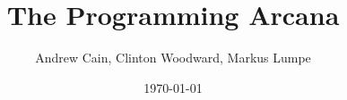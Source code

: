\newcommand{\mccode}[4]
{
  \lstset{language=C}
  
}


\newcommand{\csnipet}[1]
{
  \lstset{language=C}
  \lstinline^#1^
}

\newcommand{\bashcode}[3]
{
  \lstset{language=bash}
  
}

\newcommand{\bashsnipet}[1]
{
  \lstset{language=bash}
  \lstinline^#1^
}


\captionsetup[lstlisting]{labelfont=bf} 

\addtolength{\evensidemargin}{-0.50in}
\addtolength{\textwidth}{0.50in}

\addtolength{\topmargin}{-0.25in}
\addtolength{\textheight}{1.25in}

\usepackage{phdthesis}


\usepackage{lipsum,framed,color}

\newlength{\boxwidth}
\newsavebox{\boxcontainer}

\newcommand\mybox[1]{%
  \begin{center}%
    \fcolorbox{black}{shadecolor}{%
      \begin{minipage}[t]{\dimexpr\textwidth-2\fboxsep-2\fboxrule}%
        #1%
      \end{minipage}}%
  \end{center}}

\newenvironment{Mybox}%
  {\begin{lrbox}{\boxcontainer}%
     \begin{minipage}{\dimexpr\textwidth-2\fboxsep-2\fboxrule}}%
  {\end{minipage}\end{lrbox}%
   \begin{center}%
     \fcolorbox{black}{shadecolor}{\usebox{\boxcontainer}}
   \end{center}}

\newenvironment{MyBox}{%
  \def\FrameCommand{\fcolorbox{black}{shadecolor}}%
  \MakeFramed{\setlength{\hsize}{\dimexpr\textwidth-2\fboxsep-2\fboxrule} \FrameRestore}}%
{\endMakeFramed}

\setlength{\fboxrule}{0pt}
\setlength{\fboxsep}{9pt}

\setlength{\FrameRule}{\fboxrule}
\setlength{\FrameSep}{\fboxsep}

\usepackage[bookmarks=true,colorlinks=true,linkcolor=blue,plainpages=false,pdfpagelabels]{hyperref}




\title{The Programming Arcana}
\author{Andrew Cain, Clinton Woodward, Markus Lumpe}
\date{\today}
